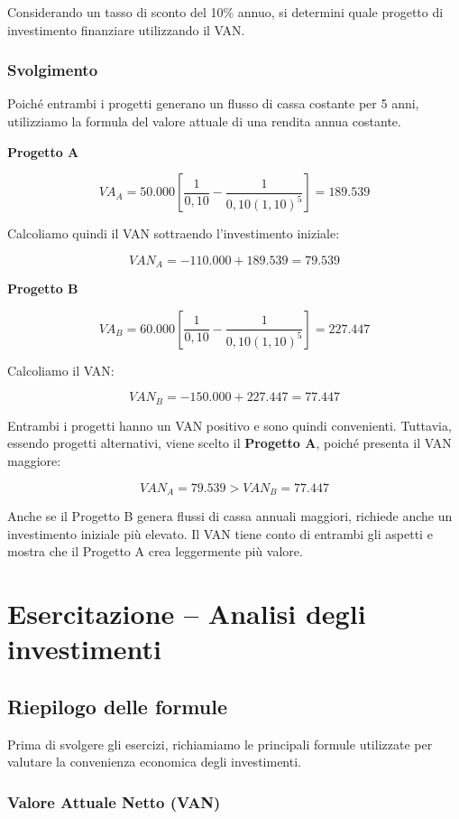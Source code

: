 \noindent Considerando un tasso di sconto del 10\% annuo, si determini quale
progetto di investimento finanziare utilizzando il VAN.
\subsubsection*{Svolgimento}

\noindent Poiché entrambi i progetti generano un flusso di cassa costante per
5 anni, utilizziamo la formula del valore attuale di una rendita annua costante.

\noindent\textbf{Progetto A}

\[
VA_A=
50.000
\left[
\frac{1}{0,10}
-\frac{1}{0,10(1,10)^5}
\right]
=189.539
\]

\noindent Calcoliamo quindi il VAN sottraendo l'investimento iniziale:

\[
VAN_A=-110.000+189.539
=\boxed{79.539}
\]

\noindent\textbf{Progetto B}

\[
VA_B=
60.000
\left[
\frac{1}{0,10}
-\frac{1}{0,10(1,10)^5}
\right]
=227.447
\]

\noindent Calcoliamo il VAN:

\[
VAN_B=-150.000+227.447
=\boxed{77.447}
\]

\noindent Entrambi i progetti hanno un VAN positivo e sono quindi convenienti.
Tuttavia, essendo progetti alternativi, viene scelto il \textbf{Progetto A},
poiché presenta il VAN maggiore:

\[
\boxed{VAN_A=79.539 > VAN_B=77.447}
\]

\noindent Anche se il Progetto B genera flussi di cassa annuali maggiori,
richiede anche un investimento iniziale più elevato. Il VAN tiene conto di
entrambi gli aspetti e mostra che il Progetto A crea leggermente più valore.
\newpage
\section{Esercitazione -- Analisi degli investimenti}

\subsection*{Riepilogo delle formule}

\noindent Prima di svolgere gli esercizi, richiamiamo le principali formule
utilizzate per valutare la convenienza economica degli investimenti.

\subsubsection*{Valore Attuale Netto (VAN)}

